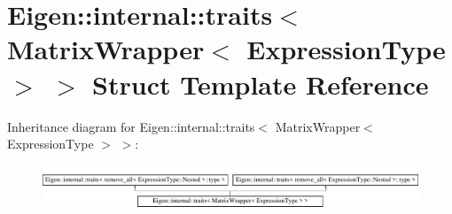 \hypertarget{struct_eigen_1_1internal_1_1traits_3_01_matrix_wrapper_3_01_expression_type_01_4_01_4}{}\section{Eigen\+:\+:internal\+:\+:traits$<$ Matrix\+Wrapper$<$ Expression\+Type $>$ $>$ Struct Template Reference}
\label{struct_eigen_1_1internal_1_1traits_3_01_matrix_wrapper_3_01_expression_type_01_4_01_4}
Inheritance diagram for Eigen\+:\+:internal\+:\+:traits$<$ Matrix\+Wrapper$<$ Expression\+Type $>$ $>$\+:\begin{figure}[H]
\begin{center}
\leavevmode
\includegraphics[height=1.372549cm]{struct_eigen_1_1internal_1_1traits_3_01_matrix_wrapper_3_01_expression_type_01_4_01_4}
\end{center}
\end{figure}

